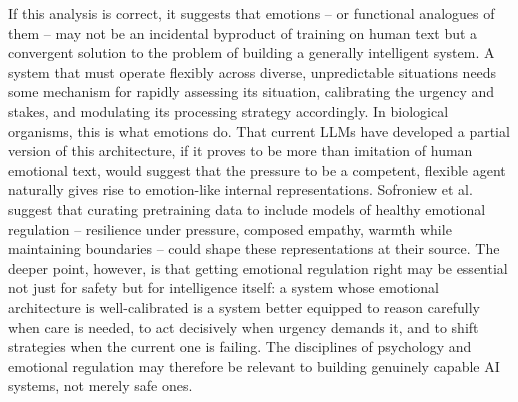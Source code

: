 \documentclass[11pt, a4paper, onecolumn, gdm]{google}
\begin{document}
If this analysis is correct, it suggests that emotions -- or functional analogues of them -- may not be an incidental byproduct of training on human text but a convergent solution to the problem of building a generally intelligent system.
A system that must operate flexibly across diverse, unpredictable situations needs some mechanism for rapidly assessing its situation, calibrating the urgency and stakes, and modulating its processing strategy accordingly.
In biological organisms, this is what emotions do. That current LLMs have developed a partial version of this architecture, if it proves to be more than imitation of human emotional text, would suggest that the pressure to be a competent, flexible agent naturally gives rise to emotion-like internal representations.
Sofroniew et al. suggest that curating pretraining data to include models of healthy emotional regulation -- resilience under pressure, composed empathy, warmth while maintaining boundaries -- could shape these representations at their source.
The deeper point, however, is that getting emotional regulation right may be essential not just for safety but for intelligence itself: a system whose emotional architecture is well-calibrated is a system better equipped to reason carefully when care is needed, to act decisively when urgency demands it, and to shift strategies when the current one is failing.
The disciplines of psychology and emotional regulation may therefore be relevant to building genuinely capable AI systems, not merely safe ones.
\end{document}

